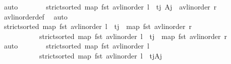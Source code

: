 \begin{isabellebody}
\ auto\isanewline
\ \ \ \ \isamarkupfalse%
\ \isamarkupfalse%
\ {\isachardoublequoteopen}strict{\isacharunderscore}{\kern0pt}sorted\ {\isacharparenleft}{\kern0pt}map\ fst\ {\isacharparenleft}{\kern0pt}avl{\isacharunderscore}{\kern0pt}inorder\ l\ {\isacharat}{\kern0pt}\ {\isacharparenleft}{\kern0pt}t\isactrlsub j{\isacharcomma}{\kern0pt}\ A\isactrlsub j{\isacharparenright}{\kern0pt}\ {\isacharhash}{\kern0pt}\ avl{\isacharunderscore}{\kern0pt}inorder\ r{\isacharparenright}{\kern0pt}{\isacharparenright}{\kern0pt}{\isachardoublequoteclose}\isanewline
\ \ \ \ \ \ \isamarkupfalse%
\ avl{\isacharunderscore}{\kern0pt}inorder{\isacharunderscore}{\kern0pt}def\ \isamarkupfalse%
\ auto\isanewline
\ \ \ \ \isamarkupfalse%
\ \isamarkupfalse%
\ {\isachardoublequoteopen}strict{\isacharunderscore}{\kern0pt}sorted\ {\isacharparenleft}{\kern0pt}map\ fst\ {\isacharparenleft}{\kern0pt}avl{\isacharunderscore}{\kern0pt}inorder\ l{\isacharparenright}{\kern0pt}\ {\isacharat}{\kern0pt}\ t\isactrlsub j\ {\isacharhash}{\kern0pt}\ map\ fst\ {\isacharparenleft}{\kern0pt}avl{\isacharunderscore}{\kern0pt}inorder\ r{\isacharparenright}{\kern0pt}{\isacharparenright}{\kern0pt}{\isachardoublequoteclose}\isanewline
\ \ \ \ \ \ \ \ \ \ \ {\isachardoublequoteopen}strict{\isacharunderscore}{\kern0pt}sorted\ {\isacharparenleft}{\kern0pt}map\ fst\ {\isacharparenleft}{\kern0pt}avl{\isacharunderscore}{\kern0pt}inorder\ l{\isacharparenright}{\kern0pt}\ {\isacharat}{\kern0pt}\ {\isacharbrackleft}{\kern0pt}t\isactrlsub j{\isacharbrackright}{\kern0pt}\ {\isacharat}{\kern0pt}\ map\ fst\ {\isacharparenleft}{\kern0pt}avl{\isacharunderscore}{\kern0pt}inorder\ r{\isacharparenright}{\kern0pt}{\isacharparenright}{\kern0pt}{\isachardoublequoteclose}\isanewline
\ \ \ \ \ \ \isamarkupfalse%
\ auto\isanewline
\ \ \ \ \isamarkupfalse%
\ \isamarkupfalse%
\ {\isachardoublequoteopen}strict{\isacharunderscore}{\kern0pt}sorted\ {\isacharparenleft}{\kern0pt}map\ fst\ {\isacharparenleft}{\kern0pt}avl{\isacharunderscore}{\kern0pt}inorder\ l{\isacharparenright}{\kern0pt}{\isacharparenright}{\kern0pt}{\isachardoublequoteclose}\ \isanewline
\ \ \ \ \ \ \ \ \ \ \ {\isachardoublequoteopen}strict{\isacharunderscore}{\kern0pt}sorted\ {\isacharparenleft}{\kern0pt}map\ fst\ {\isacharparenleft}{\kern0pt}avl{\isacharunderscore}{\kern0pt}inorder\ l\ {\isacharat}{\kern0pt}\ {\isacharbrackleft}{\kern0pt}{\isacharparenleft}{\kern0pt}t\isactrlsub j{\isacharcomma}{\kern0pt}A\isactrlsub j{\isacharparenright}{\kern0pt}{\isacharbrackright}{\kern0pt}{\isacharparenright}{\kern0pt}{\isacharparenright}{\kern0pt}{\isachardoublequoteclose}\isanewline

\end{isabellebody}
